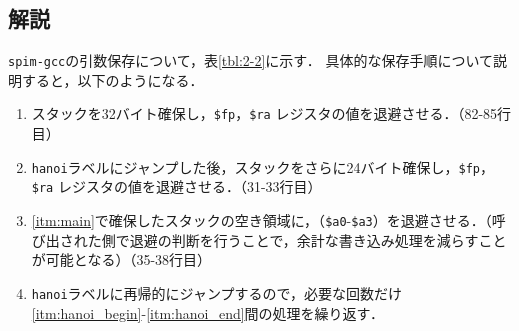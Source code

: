 \documentclass[a4j,11pt]{jarticle}
\begin{document}
\subsection{解説}

{\tt spim-gcc}の引数保存について，表\ref{tbl:2-2}に示す．
具体的な保存手順について説明すると，以下のようになる．
\begin{enumerate}
      \item \label{itm:main}スタックを32バイト確保し，{{\tt \$fp}}，{{\tt \$ra}} レジスタの値を退避させる．（82-85行目）
      \item \label{itm:hanoi_begin}{\tt hanoi}ラベルにジャンプした後，スタックをさらに24バイト確保し，{{\tt \$fp}}，{{\tt \$ra}} レジスタの値を退避させる．（31-33行目）
      \item \label{itm:hanoi_end}\ref{itm:main}で確保したスタックの空き領域に，（{{\tt \$a0}}-{{\tt \$a3}}）を退避させる．（呼び出された側で退避の判断を行うことで，余計な書き込み処理を減らすことが可能となる）（35-38行目）
      \item {\tt hanoi}ラベルに再帰的にジャンプするので，必要な回数だけ\ref{itm:hanoi_begin}-\ref{itm:hanoi_end}間の処理を繰り返す．
\end{enumerate}
\end{document}
